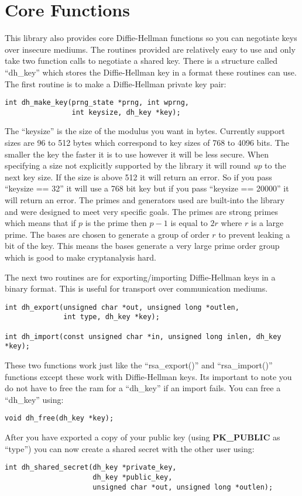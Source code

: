 \documentclass[a4paper]{book}
\begin{document}
\section{Core Functions}

This library also provides core Diffie-Hellman functions so you can negotiate keys over insecure mediums.  The routines 
provided are relatively easy to use and only take two function calls to negotiate a shared key.  There is a structure
called ``dh\_key'' which stores the Diffie-Hellman key in a format these routines can use.  The first routine is to
make a Diffie-Hellman private key pair:
\begin{verbatim}
int dh_make_key(prng_state *prng, int wprng, 
                int keysize, dh_key *key);
\end{verbatim}
The ``keysize'' is the size of the modulus you want in bytes.  Currently support sizes are 96 to 512 bytes which correspond 
to key sizes of 768 to 4096 bits. The smaller the key the faster it is to use however it will be less secure.  When 
specifying a size not explicitly supported by the library it will round {\em up} to the next key size.  If the size is 
above 512 it will return an error.  So if you pass ``keysize == 32'' it will use a 768 bit key but if you pass 
``keysize == 20000'' it will return an error.  The primes and generators used are built-into the library and were designed 
to meet very specific goals.  The primes are strong primes which means that if $p$ is the prime then
$p-1$ is equal to $2r$ where $r$ is a large prime.  The bases are chosen to generate a group of order $r$ to prevent
leaking a bit of the key.  This means the bases generate a very large prime order group which is good to make cryptanalysis
hard.

The next two routines are for exporting/importing Diffie-Hellman keys in a binary format.  This is useful for transport
over communication mediums.  

 
\begin{verbatim}
int dh_export(unsigned char *out, unsigned long *outlen, 
              int type, dh_key *key);

int dh_import(const unsigned char *in, unsigned long inlen, dh_key *key);
\end{verbatim}

These two functions work just like the ``rsa\_export()'' and ``rsa\_import()'' functions except these work with 
Diffie-Hellman keys. Its important to note you do not have to free the ram for a ``dh\_key'' if an import fails.  You can free a 
``dh\_key'' using:
\begin{verbatim}
void dh_free(dh_key *key);
\end{verbatim}
After you have exported a copy of your public key (using {\bf PK\_PUBLIC} as ``type'') you can now create a shared secret 
with the other user using:
\begin{verbatim}
int dh_shared_secret(dh_key *private_key, 
                     dh_key *public_key, 
                     unsigned char *out, unsigned long *outlen);
\end{verbatim}
\end{document}
